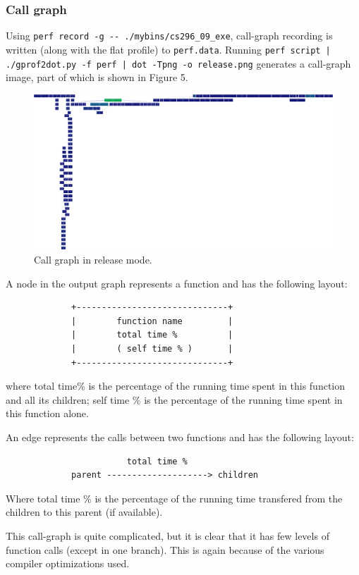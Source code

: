 \documentclass[11pt,english]{article}
\begin{document}
\subsubsection{Call graph}
\indent 
\par{Using \verb+perf record -g -- ./mybins/cs296_09_exe+, call-graph recording is written (along with the flat profile) to \verb+perf.data+. Running \verb+perf script | ./gprof2dot.py -f perf | dot -Tpng -o release.png+ generates a call-graph image, part of which is shown in Figure 5.}
\begin{figure}[h!]
\centering
\includegraphics[scale=.05]{release_callgraph}
\caption{Call graph in release mode.}
\end{figure}
\indent
\par{A node in the output graph represents a function and has the following layout: 
\begin{verbatim}
             +------------------------------+
             |        function name         |
             |        total time %          |
             |        ( self time % )       |
             +------------------------------+
\end{verbatim}
where total time\% is the percentage of the running time spent in this function and all its children; self time \% is the percentage of the running time spent in this function alone.
}
\indent \par{An edge represents the calls between two functions and has the following layout: 
\begin{verbatim}
                        total time %
             parent --------------------> children
\end{verbatim}
Where total time \% is the percentage of the running time transfered from the children to this parent (if available).
}
\par{This call-graph is quite complicated, but it is clear that it has few levels of function calls (except in one branch). This is again because of the various compiler optimizations used.}
\end{document}
